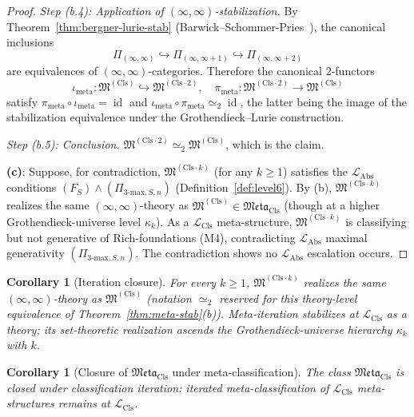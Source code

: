 \documentclass[11pt]{article}
\theoremstyle{plain}
\newtheorem{corollary}[theorem]{Corollary}
\theoremstyle{definition}
\newcommand{\fM}{\mathfrak{M}}
\newcommand{\Meta}{\mathfrak{Meta}}
\newcommand{\LCls}{\mathcal{L}_{\mathrm{Cls}}}
\newcommand{\LAbs}{\mathcal{L}_{\mathrm{Abs}}}
\DeclareMathOperator{\id}{id}
\begin{document}
\begin{proof}
\emph{Step (b.4): Application of $(\infty, \infty)$-stabilization.} By Theorem~\ref{thm:bergner-lurie-stab} (Barwick--Schommer-Pries~\cite{BarwickSchommerPries2021}), the canonical inclusions
\[ \Pi_{(\infty, \infty)} \hookrightarrow \Pi_{(\infty, \infty + 1)} \hookrightarrow \Pi_{(\infty, \infty + 2)} \]
are equivalences of $(\infty, \infty)$-categories. Therefore the canonical $2$-functors
\[ \iota_{\mathrm{meta}} : \fM^{(\mathrm{Cls})} \hookrightarrow \fM^{(\mathrm{Cls}\cdot 2)}, \quad \pi_{\mathrm{meta}} : \fM^{(\mathrm{Cls}\cdot 2)} \to \fM^{(\mathrm{Cls})} \]
satisfy $\pi_{\mathrm{meta}} \circ \iota_{\mathrm{meta}} = \id$ and $\iota_{\mathrm{meta}} \circ \pi_{\mathrm{meta}} \simeq_2 \id$, the latter being the image of the stabilization equivalence under the Grothendieck--Lurie construction.

\emph{Step (b.5): Conclusion.} $\fM^{(\mathrm{Cls}\cdot 2)} \simeq_2 \fM^{(\mathrm{Cls})}$, which is the claim.

\textbf{(c)}: Suppose, for contradiction, $\fM^{(\mathrm{Cls}\cdot k)}$ (for any $k \geq 1$) satisfies the $\LAbs$ conditions $(F_S) \wedge (\Pi_{3\text{-max}, S, n})$ (Definition~\ref{def:level6}). By (b), $\fM^{(\mathrm{Cls}\cdot k)}$ realizes the same $(\infty, \infty)$-theory as $\fM^{(\mathrm{Cls})} \in \Meta_{\mathrm{Cls}}$ (though at a higher Grothendieck-universe level $\kappa_k$). As a $\LCls$ meta-structure, $\fM^{(\mathrm{Cls}\cdot k)}$ is classifying but not generative of Rich-foundations (M4), contradicting $\LAbs$ maximal generativity $(\Pi_{3\text{-max}, S, n})$. The contradiction shows no $\LAbs$ escalation occurs.
\end{proof}

\begin{corollary}[Iteration closure]\label{cor:iteration-closure}
For every $k \geq 1$, $\fM^{(\mathrm{Cls}\cdot k)}$ realizes the same $(\infty, \infty)$-theory as $\fM^{(\mathrm{Cls})}$ (notation $\simeq_2$ reserved for this theory-level equivalence of Theorem~\ref{thm:meta-stab}(b)). Meta-iteration stabilizes at $\LCls$ \emph{as a theory}; its set-theoretic realization ascends the Grothendieck-universe hierarchy $\kappa_k$ with $k$.
\end{corollary}

\begin{corollary}[Closure of $\Meta_{\mathrm{Cls}}$ under meta-classification]\label{cor:meta-closure}
The class $\Meta_{\mathrm{Cls}}$ is closed under classification iteration: iterated meta-classification of $\LCls$ meta-structures remains at $\LCls$.
\end{corollary}
\end{document}
